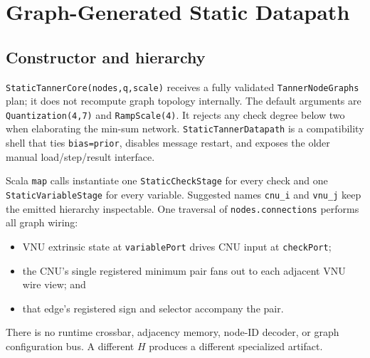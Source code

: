 \documentclass[10pt,conference]{IEEEtran}
\begin{document}
\section{Graph-Generated Static Datapath}
\subsection{Constructor and hierarchy}
\texttt{StaticTannerCore(nodes,q,scale)} receives a fully validated
\texttt{TannerNodeGraphs} plan; it does not recompute graph topology internally.
The default arguments are \texttt{Quantization(4,7)} and
\texttt{RampScale(4)}.  It rejects any check degree below two when elaborating
the min-sum network.  \texttt{StaticTannerDatapath} is a compatibility shell
that ties \texttt{bias=prior}, disables message restart, and exposes the older
manual load/step/result interface.

Scala \texttt{map} calls instantiate one \texttt{StaticCheckStage} for every
check and one \texttt{StaticVariableStage} for every variable.  Suggested names
\texttt{cnu\_i} and \texttt{vnu\_j} keep the emitted hierarchy inspectable.
One traversal of \texttt{nodes.connections} performs all graph wiring:
\begin{itemize}
  \item VNU extrinsic state at \texttt{variablePort} drives CNU input at
        \texttt{checkPort};
  \item the CNU's single registered minimum pair fans out to each adjacent
        VNU wire view; and
  \item that edge's registered sign and selector accompany the pair.
\end{itemize}
There is no runtime crossbar, adjacency memory, node-ID decoder, or graph
configuration bus.  A different $H$ produces a different specialized artifact.
\end{document}
